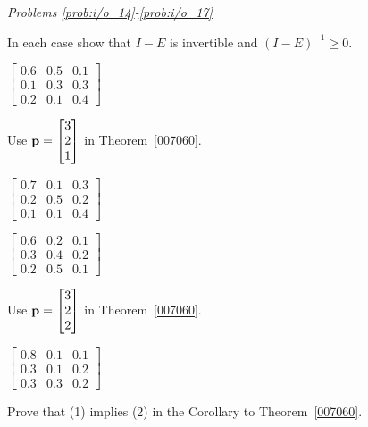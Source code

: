 \documentclass{ximera}
\begin{document}
\emph{Problems \ref{prob:i/o_14}-\ref{prob:i/o_17}}

In each case show that $I - E$ is invertible and $(I - E)^{-1} \geq 0$.

\begin{problem}\label{prob:i/o_14}
$\begin{bmatrix}
0.6 & 0.5 & 0.1 \\
0.1 & 0.3 & 0.3 \\
0.2 & 0.1 & 0.4
\end{bmatrix}$
\begin{hint}
Use ${\bf p} = \begin{bmatrix}
3 \\
2 \\
1
\end{bmatrix}$
 in Theorem~\ref{007060}.
\end{hint}
\end{problem}
\begin{problem}\label{prob:i/o_15}
$\begin{bmatrix}
0.7 & 0.1 & 0.3 \\
0.2 & 0.5 & 0.2 \\
0.1 & 0.1 & 0.4
\end{bmatrix}$
\end{problem}

\begin{problem}\label{prob:i/o_16}
$\begin{bmatrix}
0.6 & 0.2 & 0.1 \\
0.3 & 0.4 & 0.2 \\
0.2 & 0.5 & 0.1
\end{bmatrix}$
\begin{hint}
Use ${\bf p} = \begin{bmatrix}
3 \\
2 \\
2
\end{bmatrix}$
 in Theorem~\ref{007060}.
\end{hint}
\end{problem}

\begin{problem}\label{prob:i/o_17}
$\begin{bmatrix}
0.8 & 0.1 & 0.1 \\
0.3 & 0.1 & 0.2 \\
0.3 & 0.3 & 0.2
\end{bmatrix}$
\end{problem}


\begin{problem}\label{ex:ex2_8_10}
Prove that (1) implies (2) in the Corollary to Theorem~\ref{007060}.
\end{problem}
\end{document}
